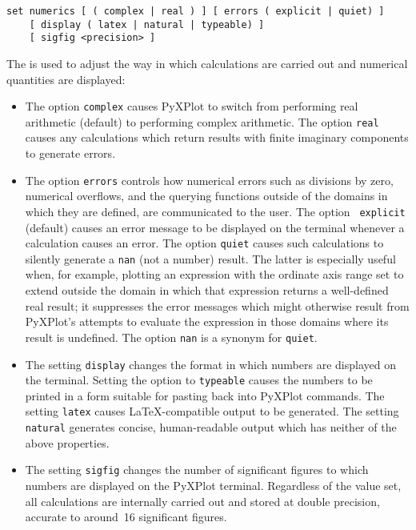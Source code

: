 \begin{verbatim}
set numerics [ ( complex | real ) ] [ errors ( explicit | quiet) ]
    [ display ( latex | natural | typeable) ]
    [ sigfig <precision> ]
\end{verbatim}

The  is used to adjust the way in which calculations are
carried out and numerical quantities are displayed:

\begin{itemize}

\item The option {\tt complex} causes PyXPlot to switch from performing real
arithmetic (default) to performing complex arithmetic. The option {\tt real}
causes any calculations which return results with finite imaginary components
to generate errors.

\item The option {\tt errors} controls how numerical errors such as divisions
by zero, numerical overflows, and the querying functions outside of the domains
in which they are defined, are communicated to the user.  The option {\tt
explicit} (default) causes an error message to be displayed on the terminal
whenever a calculation causes an error.  The option {\tt quiet} causes such
calculations to silently generate a {\tt nan} (not a number) result. The latter
is especially useful when, for example, plotting an expression with the
ordinate axis range set to extend outside the domain in which that expression
returns a well-defined real result; it suppresses the error messages which
might otherwise result from PyXPlot's attempts to evaluate the expression in
those domains where its result is undefined. The option {\tt nan} is a synonym
for {\tt quiet}.

\item The setting {\tt display} changes the format in which numbers are
displayed on the terminal.  Setting the option to {\tt typeable} causes the
numbers to be printed in a form suitable for pasting back into PyXPlot
commands.  The setting {\tt latex} causes \LaTeX-compatible output to be
generated.  The setting {\tt natural} generates concise, human-readable output
which has neither of the above properties.

\item The setting {\tt sigfig} changes the number of significant figures to
which numbers are displayed on the PyXPlot terminal.  Regardless of the value
set, all calculations are internally carried out and stored at double
precision, accurate to around~16 significant figures.

\end{itemize}


